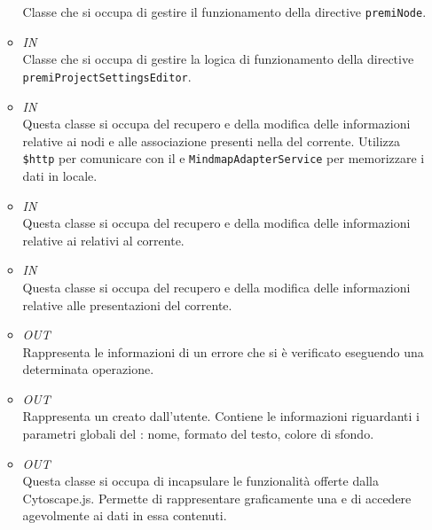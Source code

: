 \begin{itemize}
\begin{itemize}
Classe che si occupa di gestire il funzionamento della directive \texttt{premiNode}.
\item \textit{IN} \hyperref[\nogloxy{Premi::Front-End::Controllers::ProjectSettingsEditorController}]{}\\
Classe che si occupa di gestire la logica di funzionamento della directive \texttt{premiProjectSettingsEditor}.
\item \textit{IN} \hyperref[\nogloxy{Premi::Front-End::Services::MindmapService}]{}\\
Questa classe si occupa del recupero e della modifica delle informazioni relative ai nodi e alle associazione presenti nella  del  corrente. Utilizza \texttt{\$http} per comunicare con il  e \texttt{MindmapAdapterService} per memorizzare i dati in locale.
\item \textit{IN} \hyperref[\nogloxy{Premi::Front-End::Services::PathService}]{}\\
Questa classe si occupa del recupero e della modifica delle informazioni relative ai  relativi al  corrente.
\item \textit{IN} \hyperref[\nogloxy{Premi::Front-End::Services::PresentationService}]{}\\
Questa classe si occupa del recupero e della modifica delle informazioni relative alle presentazioni del  corrente.
\item \textit{OUT} \hyperref[\nogloxy{Premi::Front-End::Model::ErrorInfo}]{}\\
Rappresenta le informazioni di un errore che si è verificato eseguendo una determinata operazione.
\item \textit{OUT} \hyperref[\nogloxy{Premi::Front-End::Model::Project}]{}\\
Rappresenta un  creato dall’utente. Contiene le informazioni riguardanti i parametri globali del : nome, formato del testo, colore di sfondo.
\item \textit{OUT} \hyperref[\nogloxy{Premi::Front-End::Services::MindmapAdapterService}]{}\\
Questa classe si occupa di incapsulare le funzionalità offerte dalla  Cytoscape.js. Permette di rappresentare graficamente una  e di accedere agevolmente ai dati in essa contenuti.

\end{itemize}
\end{itemize}
